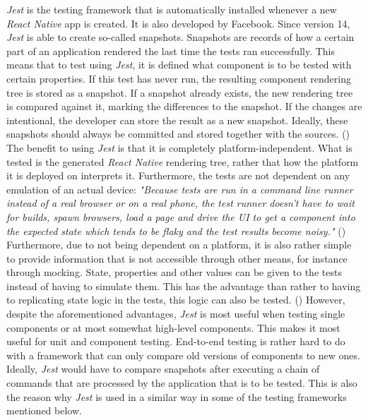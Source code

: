 \textit{Jest} is the testing framework that is automatically installed whenever a new \textit{React Native} app is created. It is also developed by Facebook. Since version 14, \textit{Jest} is able to create so-called snapshots. Snapshots are records of how a certain part of an application rendered the last time the tests ran successfully. This means that to test using \textit{Jest}, it is defined what component is to be tested with certain properties. If this test has never run, the resulting component rendering tree is stored as a snapshot. If a snapshot already exists, the new rendering tree is compared against it, marking the differences to the snapshot. If the changes are intentional, the developer can store the result as a new snapshot. Ideally, these snapshots should always be committed and stored together with the sources. (\cite{testing-react-native})
\newline
The benefit to using \textit{Jest} is that it is completely platform-independent. What is tested is the generated \textit{React Native} rendering tree, rather that how the platform it is deployed on interprets it. Furthermore, the tests are not dependent on any emulation of an actual device: \textit{"Because tests are run in a command line runner instead of a real browser or on a real phone, the test runner doesn’t have to wait for builds, spawn browsers, load a page and drive the UI to get a component into the expected state which tends to be flaky and the test results become noisy."} (\cite{testing-react-native-with-jest})
\newline
Furthermore, due to not being dependent on a platform, it is also rather simple to provide information that is not accessible through other means, for instance through mocking. State, properties and other values can be given to the tests instead of having to simulate them. This has the advantage than rather to having to replicating state logic in the tests, this logic can also be tested. (\cite{learning-test-react-native})
\newline
However, despite the aforementioned advantages, \textit{Jest} is most useful when testing single components or at most somewhat high-level components. This makes it most useful for unit and component testing. End-to-end testing is rather hard to do with a framework that can only compare old versions of components to new ones. Ideally, \textit{Jest} would have to compare snapshots after executing a chain of commands that are processed by the application that is to be tested. This is also the reason why \textit{Jest} is used in a similar way in some of the testing frameworks mentioned below.

